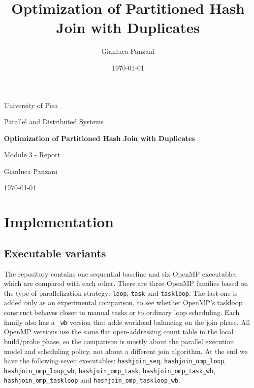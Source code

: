 \documentclass[11pt,a4paper]{article}
\title{Optimization of Partitioned Hash Join with Duplicates}
\author{Gianluca Panzani}
\date{\today}
\begin{document}
\begin{titlepage}
    \centering
    {\Large University of Pisa\par}
    \vspace{0.6cm}
    {\large Parallel and Distributed Systems\par}
    \vspace{2.0cm}
    {\LARGE \textbf{Optimization of Partitioned Hash Join with Duplicates}\par}
    \vspace{1.2cm}
    {\large Module 3 - Report\par}
    \vfill
    {\large Gianluca Panzani\par}
    \vspace{0.3cm}
    {\large \today\par}
\end{titlepage}

\tableofcontents
\newpage
{}


\section{Implementation}


\subsection{Executable variants}
The repository contains one sequential baseline and six OpenMP executables which are compared with each other. There are three OpenMP families based on the type of parallelization strategy: \texttt{loop}, \texttt{task} and \texttt{taskloop}. The last one is added only as an experimental comparison, to see whether OpenMP's taskloop construct behaves closer to manual tasks or to ordinary loop scheduling. Each family also has a \texttt{\_wb} version that adds workload balancing on the join phase. All OpenMP versions use the same flat open-addressing count table in the local build/probe phase, so the comparison is mostly about the parallel execution model and scheduling policy, not about a different join algorithm. At the end we have the following seven executables: \texttt{hashjoin\_seq}, \texttt{hashjoin\_omp\_loop}, \texttt{hashjoin\_omp\_loop\_wb}, \texttt{hashjoin\_omp\_task}, \texttt{hashjoin\_omp\_task\_wb}, \texttt{hashjoin\_omp\_taskloop} and \texttt{hashjoin\_omp\_taskloop\_wb}.
\end{document}
